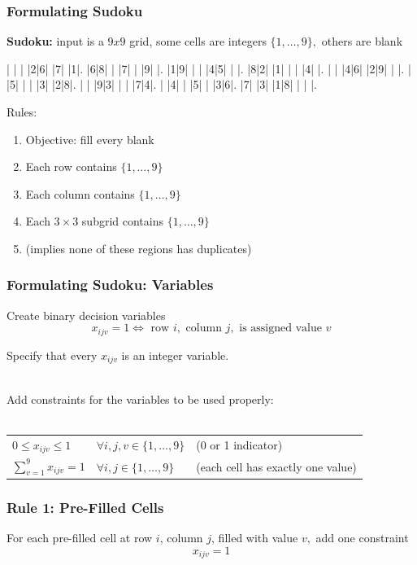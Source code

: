 \documentclass[10pt,aspectratio=169]{beamer}
\newcommand{\stanza}{ \\~\ }
\begin{document}
\begin{frame} \frametitle{Formulating Sudoku}
  \textbf{Sudoku:} input is a $9 x 9$ grid, some cells are integers $\{1, \ldots, 9\},$ others are blank

  \begin{sudoku}
    | | | |2|6| |7| |1|.
    |6|8| | |7| | |9| |.
    |1|9| | | |4|5| | |.
    |8|2| |1| | | |4| |.
    | | |4|6| |2|9| | |.
    | |5| | | |3| |2|8|.
    | | |9|3| | | |7|4|.
    | |4| | |5| | |3|6|.
    |7| |3| |1|8| | | |.
  \end{sudoku}
  
  Rules:
  \begin{enumerate}
  \item Objective: fill every blank
  \item Each row contains $\{1, \ldots, 9\}$
  \item Each column contains $\{1, \ldots, 9\}$
  \item Each $3 \times 3$ subgrid contains $\{1, \ldots, 9\}$
  \item (implies none of these regions has duplicates)
  \end{enumerate}
  
  \end{frame}

\begin{frame} \frametitle{Formulating Sudoku: Variables}
  Create binary decision variables
  \[ x_{ijv} = 1 \Leftrightarrow
  \text{ row } i,
  \text{ column } j,
  \text{ is assigned value } v \]

  Specify that every $x_{ijv}$ is an integer variable.
  \stanza

  Add constraints for the variables to be used properly:
  \stanza
  
  \begin{tabular}{lll}
    $0 \leq x_{ijv} \leq 1$ & $\forall i, j, v \in \{1, \ldots, 9\}$ & (0 or 1 indicator) \\
    $\sum_{v=1}^9 x_{ijv} = 1$ & $\forall i, j \in \{1, \ldots, 9\}$ & (each cell has exactly one value)
  \end{tabular}
  
\end{frame}

\begin{frame} \frametitle{Rule 1: Pre-Filled Cells}

  For each pre-filled cell at row $i$, column $j$, filled with value $v,$ add one constraint
  \[ x_{ijv} =1 \]

\end{frame}
\end{document}
